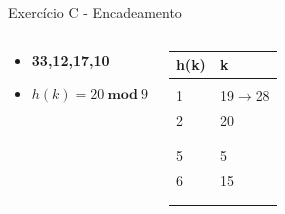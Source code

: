 \documentclass{beamer}
\begin{document}
\begin{frame}{Exercício C - Encadeamento}
\begin{columns}
        \footnotesize         
        \begin{block}{}
 		 \begin{itemize}
 		  \item \textbf{33,12,17,10}
 		  \item $h(k) = 20 \ \mathbf{mod} \ 9$  
 		 \end{itemize}

 		  \end{block} 
    
        \begin{table}[]
        \centering
        \footnotesize
        \begin{tabular}{|l|l|}
        \hline
        h(k) & k \\ \hline
            &   \\ \hline
        1   & 19$\rightarrow$28  \\ \hline
        2   & 20  \\ \hline
            &    \\ \hline
            &   \\ \hline
        5   & 5   \\ \hline
        6   & 15   \\ \hline
            &   \\ \hline
            &   \\ \hline
        \end{tabular}%

        \end{table}       
        \end{columns}
\end{frame}
\end{document}
